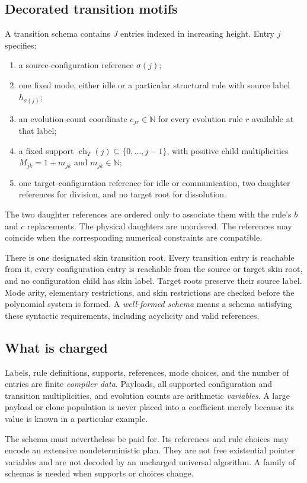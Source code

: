 \documentclass[11pt,letterpaper]{article}
\theoremstyle{definition}
\theoremstyle{remark}
\newcommand{\N}{\mathbb N}
\newcommand{\ch}{\operatorname{ch}}
\begin{document}
\subsection{Decorated transition motifs}
A transition schema contains $J$ entries indexed in increasing height. Entry $j$ specifies:
\begin{enumerate}
\item a source-configuration reference $\sigma(j)$;
\item one fixed mode, either idle or a particular structural rule with source label $h_{\sigma(j)}$;
\item an evolution-count coordinate $e_{jr}\in\N$ for every evolution rule $r$ available at that label;
\item a fixed support $\ch_T(j)\subseteq\{0,\ldots,j-1\}$, with positive child multiplicities $M_{jk}=1+m_{jk}$ and $m_{jk}\in\N$;
\item one target-configuration reference for idle or communication, two daughter references for division, and no target root for dissolution.
\end{enumerate}
The two daughter references are ordered only to associate them with the rule's $b$ and $c$ replacements. The physical daughters are unordered. The references may coincide when the corresponding numerical constraints are compatible.

There is one designated skin transition root. Every transition entry is reachable from it, every configuration entry is reachable from the source or target skin root, and no configuration child has skin label. Target roots preserve their source label. Mode arity, elementary restrictions, and skin restrictions are checked before the polynomial system is formed. A \emph{well-formed schema} means a schema satisfying these syntactic requirements, including acyclicity and valid references.

\subsection{What is charged}
Labels, rule definitions, supports, references, mode choices, and the number of entries are finite \emph{compiler data}. Payloads, all supported configuration and transition multiplicities, and evolution counts are arithmetic \emph{variables}. A large payload or clone population is never placed into a coefficient merely because its value is known in a particular example.

The schema must nevertheless be paid for. Its references and rule choices may encode an extensive nondeterministic plan. They are not free existential pointer variables and are not decoded by an uncharged universal algorithm. A family of schemas is needed when supports or choices change.
\end{document}
